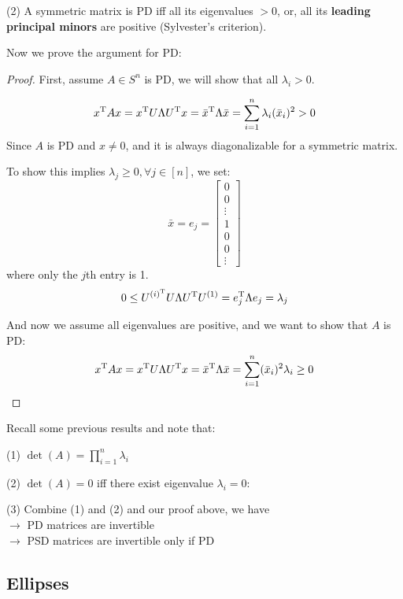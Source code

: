 (2) A symmetric matrix is PD iff all its eigenvalues $> 0$, or, all its \textbf{leading principal minors} are positive (Sylvester's criterion).

\vspace{0.3cm}
Now we prove the argument for PD:

\begin{proof}
	First, assume $A\in S^n$ is PD, we will show that all $\lambda_i > 0$. 
	
	\begin{equation*}
	x^{{\rm T}}Ax = x^{{\rm T}}U\Lambda U^{{\rm T}}x = \bar{x}^{{\rm T}}\Lambda\bar{x} = \sum^n_{i=1}\lambda_i(\bar{x}_i)^2 >0
	\end{equation*}
	Since $A$ is PD and $x\neq 0$, and it is always diagonalizable for a symmetric matrix.
	
	To show this implies $\lambda_j \geq 0, \forall j\in [n]$, we set:
	$$\bar{x} = e_j = 
	\left[
	\begin{matrix}
	0\\
	0\\
	\vdots\\
	1\\
	0\\
	0\\
	\vdots
	\end{matrix}
	\right]
	$$
	where only the $j$th entry is 1.
	$$0 \leq U^{(i)^{{\rm T}}} U\Lambda U^{{\rm T}}U^{(1)} =e_j^{{\rm T}}\Lambda e_j = \lambda_j$$
	
	And now we assume all eigenvalues are positive, and we want to show that $A$ is PD:
	$$x^{{\rm T}}Ax =x^{{\rm T}}U\Lambda U^{{\rm T}}x = \bar{x}^{{\rm T}}\Lambda \bar{x} = \sum^n_{i=1}(\bar{x}_i)^2\lambda_i \geq 0$$
\end{proof}


Recall some previous results and note that:

(1) $\det(A) = \prod^n_{i=1}\lambda_i$

(2) $\det(A) = 0$ iff there exist eigenvalue $\lambda_i = 0$:

(3) Combine (1) and (2) and our proof above, we have
\\ \qquad $\rightarrow$ PD matrices are invertible
\\ \qquad $\rightarrow$ PSD matrices are invertible only if PD





\subsection{Ellipses} 

